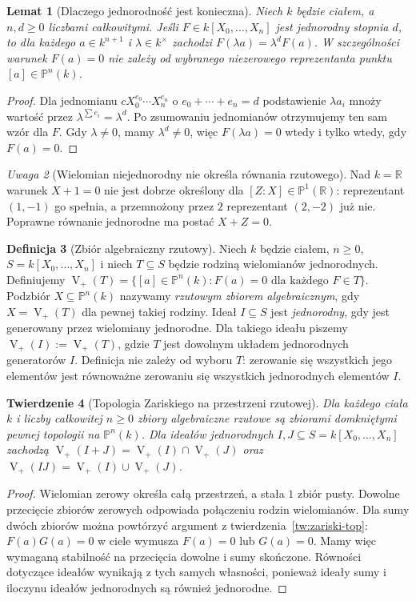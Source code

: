 \documentclass[11pt,a4paper,openany]{report}
\numberwithin{equation}{section}
\theoremstyle{plain}
\newtheorem{twierdzenie}{Twierdzenie}[section]
\newtheorem{lemat}[twierdzenie]{Lemat}
\theoremstyle{definition}
\newtheorem{definicja}[twierdzenie]{Definicja}
\theoremstyle{remark}
\newtheorem{uwaga}[twierdzenie]{Uwaga}
\newcommand{\R}{\mathbb R}
\newcommand{\PP}{\mathbb P}
\newcommand{\V}{\operatorname V}
\begin{document}
\begin{lemat}[Dlaczego jednorodność jest konieczna]
Niech $k$ będzie ciałem, a $n,d\ge0$ liczbami całkowitymi.
Jeśli $F\in k[X_0,\dots,X_n]$ jest jednorodny stopnia $d$,
to dla każdego $a\in k^{n+1}$ i $\lambda\in k^\times$ zachodzi
$F(\lambda a)=\lambda^dF(a)$. W szczególności warunek
$F(a)=0$ nie zależy od wybranego niezerowego reprezentanta
punktu $[a]\in\PP^n(k)$.
\end{lemat}
\begin{proof}
Dla jednomianu $cX_0^{e_0}\cdots X_n^{e_n}$
o $e_0+\cdots+e_n=d$ podstawienie $\lambda a_i$
mnoży wartość przez $\lambda^{\sum e_i}=\lambda^d$.
Po zsumowaniu jednomianów otrzymujemy ten sam wzór dla $F$.
Gdy $\lambda\ne0$, mamy $\lambda^d\ne0$,
więc $F(\lambda a)=0$ wtedy i tylko wtedy, gdy $F(a)=0$.
\end{proof}

\begin{uwaga}[Wielomian niejednorodny nie określa równania rzutowego]
Nad $k=\R$ warunek $X+1=0$ nie jest dobrze określony dla
$[Z:X]\in\PP^1(\R)$: reprezentant $(1,-1)$ go spełnia,
a przemnożony przez $2$ reprezentant $(2,-2)$ już nie.
Poprawne równanie jednorodne ma postać $X+Z=0$.
\end{uwaga}

\begin{definicja}[Zbiór algebraiczny rzutowy]
Niech $k$ będzie ciałem, $n\ge0$, $S=k[X_0,\dots,X_n]$ i niech $T\subseteq S$ będzie
rodziną wielomianów jednorodnych. Definiujemy
$\V_+(T)=\{[a]\in\PP^n(k):F(a)=0\text{ dla każdego }F\in T\}$.
Podzbiór $X\subseteq\PP^n(k)$ nazywamy \emph{rzutowym
zbiorem algebraicznym}, gdy $X=\V_+(T)$ dla pewnej takiej rodziny.
Ideał $I\subseteq S$ jest \emph{jednorodny}, gdy jest generowany
przez wielomiany jednorodne. Dla takiego ideału piszemy
$\V_+(I):=\V_+(T)$, gdzie $T$ jest dowolnym układem
jednorodnych generatorów $I$. Definicja nie zależy
od wyboru $T$: zerowanie się wszystkich jego elementów
jest równoważne zerowaniu się wszystkich jednorodnych
elementów $I$.
\end{definicja}

\begin{twierdzenie}[Topologia Zariskiego na przestrzeni rzutowej]
\label{tw:projective-zariski}
Dla każdego ciała $k$ i liczby całkowitej $n\ge0$ zbiory algebraiczne rzutowe
są zbiorami domkniętymi pewnej topologii na $\PP^n(k)$.
Dla ideałów jednorodnych $I,J\subseteq S=k[X_0,\dots,X_n]$ zachodzą
$\V_+(I+J)=\V_+(I)\cap\V_+(J)$ oraz
$\V_+(IJ)=\V_+(I)\cup\V_+(J)$.
\end{twierdzenie}
\begin{proof}
Wielomian zerowy określa całą przestrzeń, a stała $1$
zbiór pusty. Dowolne przecięcie zbiorów zerowych odpowiada
połączeniu rodzin wielomianów. Dla sumy dwóch zbiorów
można powtórzyć argument z twierdzenia~\ref{tw:zariski-top}:
$F(a)G(a)=0$ w ciele wymusza $F(a)=0$ lub $G(a)=0$.
Mamy więc wymaganą stabilność na przecięcia dowolne i sumy
skończone. Równości dotyczące ideałów wynikają z tych samych
własności, ponieważ ideały sumy i iloczynu ideałów jednorodnych
są również jednorodne.
\end{proof}
\end{document}
